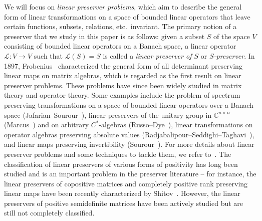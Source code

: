 \documentclass[11pt,reqno]{amsart}
\theoremstyle{plain}
\theoremstyle{definition}
\numberwithin{equation}{section}
\begin{document}
We will focus on \textit{linear preserver problems}, which aim to describe the general form of linear transformations on a space of bounded linear operators that leave certain functions, subsets, relations, etc.\ invariant. The primary notion of a preserver that we study in this paper is as follows: given a subset $S$ of the space $V$ consisting of bounded linear operators on a Banach space, a linear operator $\mathcal{L}:V\to V$ such that $\mathcal{L}(S)=S$ is called a \textit{linear preserver of $S$} or \textit{$S$-preserver}.
In 1897, Frobenius~\cite{Frobenius1897} characterized the general form of all determinant preserving linear maps on matrix algebras, which is regarded as the first result on linear preserver problems. These problems have since been widely studied in matrix theory and operator theory. Some examples include the problem of spectrum preserving transformations on a space of bounded linear operators over a Banach space (Jafarian--Sourour~\cite{Jaf-Sour86}), linear preservers of the unitary group in $\mathbb{C}^{n\times n}$ (Marcus~\cite{Marcus59}) and on arbitrary $C^*$-algebras (Russo--Dye~\cite{Russo-Dye66}), %
linear transformations on operator algebras preserving absolute values
(Radjabalipour--Seddighi--Taghavi~\cite{Radja-Sedd-Tag01}), and linear
maps preserving invertibility (Sourour~\cite{Sour96}). For more details about linear preserver problems and some techniques to tackle them, we refer to~\cite{GLS2000,Li-Pierce01,Molnar07}. The classification of linear preservers of various forms of positivity has long been studied and is an important problem in the preserver literature -- for instance, the linear preservers of copositive matrices and completely positive rank preserving linear maps  have been recently characterized by Shitov~\cite{Shi21,Shi23}. However,  the linear preservers of positive semidefinite matrices have been actively studied but are  still not completely classified.
\end{document}
